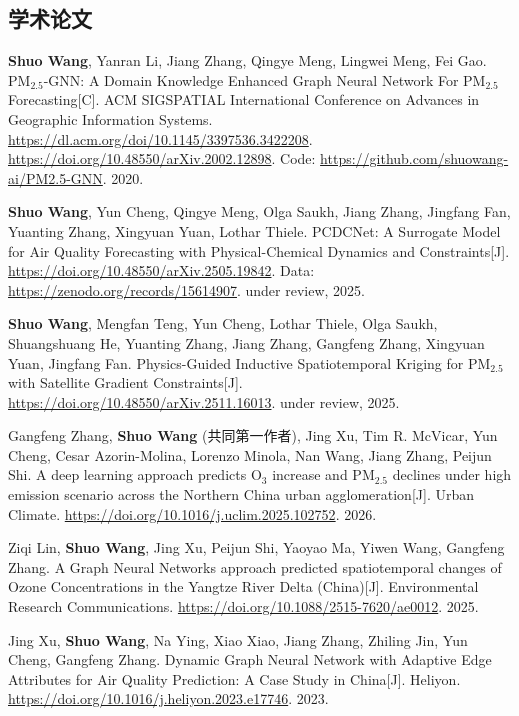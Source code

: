 
\begin{resume}

  \section*{学术论文}

  \begin{achievements}
    \item \textbf{Shuo Wang}, Yanran Li, Jiang Zhang, Qingye Meng, Lingwei Meng, Fei Gao. PM$_{2.5}$-GNN: A Domain Knowledge Enhanced Graph Neural Network For PM$_{2.5}$ Forecasting[C]. ACM SIGSPATIAL International Conference on Advances in Geographic Information Systems. \url{https://dl.acm.org/doi/10.1145/3397536.3422208}. \url{https://doi.org/10.48550/arXiv.2002.12898}. Code: \url{https://github.com/shuowang-ai/PM2.5-GNN}. 2020.
    \item \textbf{Shuo Wang}, Yun Cheng, Qingye Meng, Olga Saukh, Jiang Zhang, Jingfang Fan, Yuanting Zhang, Xingyuan Yuan, Lothar Thiele. PCDCNet: A Surrogate Model for Air Quality Forecasting with Physical-Chemical Dynamics and Constraints[J]. \url{https://doi.org/10.48550/arXiv.2505.19842}. Data: \url{https://zenodo.org/records/15614907}. under review, 2025.
    \item \textbf{Shuo Wang}, Mengfan Teng, Yun Cheng, Lothar Thiele, Olga Saukh, Shuangshuang He, Yuanting Zhang, Jiang Zhang, Gangfeng Zhang, Xingyuan Yuan, Jingfang Fan. Physics-Guided Inductive Spatiotemporal Kriging for PM$_{2.5}$ with Satellite Gradient Constraints[J]. \url{https://doi.org/10.48550/arXiv.2511.16013}. under review, 2025.
    \item Gangfeng Zhang, \textbf{Shuo Wang} (共同第一作者), Jing Xu, Tim R. McVicar, Yun Cheng, Cesar Azorin-Molina, Lorenzo Minola, Nan Wang, Jiang Zhang, Peijun Shi. A deep learning approach predicts O$_3$ increase and PM$_{2.5}$ declines under high emission scenario across the Northern China urban agglomeration[J]. Urban Climate. \url{https://doi.org/10.1016/j.uclim.2025.102752}. 2026.
    \item Ziqi Lin, \textbf{Shuo Wang}, Jing Xu, Peijun Shi, Yaoyao Ma, Yiwen Wang, Gangfeng Zhang. A Graph Neural Networks approach predicted spatiotemporal changes of Ozone Concentrations in the Yangtze River Delta (China)[J]. Environmental Research Communications. \url{https://doi.org/10.1088/2515-7620/ae0012}. 2025.
    \item Jing Xu, \textbf{Shuo Wang}, Na Ying, Xiao Xiao, Jiang Zhang, Zhiling Jin, Yun Cheng, Gangfeng Zhang. Dynamic Graph Neural Network with Adaptive Edge Attributes for Air Quality Prediction: A Case Study in China[J]. Heliyon. \url{https://doi.org/10.1016/j.heliyon.2023.e17746}. 2023.

\end{achievements}
\end{resume}
